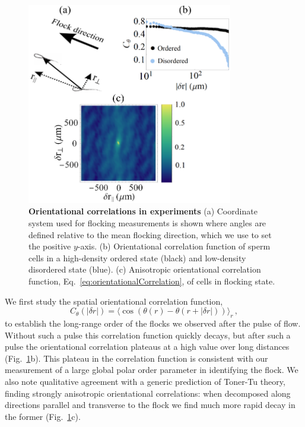 \documentclass[reprint,unsortedaddress,amsmath,amssymb,aps,pre]{revtex4-2}
\begin{document}
\begin{figure}[h]
        \centering
        \includegraphics[width=90mm]{fig_FieldCorrelations_Orientation.PNG}
        \caption{\label{fig::OrientationalSpatialStructure}
        \textbf{Orientational correlations in experiments}
        (a) Coordinate system used for flocking measurements is shown where angles are defined relative to the mean flocking direction, which we use to set the positive $y$-axis. (b) Orientational correlation function of sperm cells in a high-density ordered state (black) and low-density disordered state (blue). (c) Anisotropic orientational correlation function, Eq.~\ref{eq:orientationalCorrelation}, of cells in flocking state.}
\end{figure}

We first study the spatial orientational correlation function,
\begin{equation}\label{eq:orientationalCorrelation}
    C_{\theta}(|\delta{r}|)=\langle{\cos(\theta(r)-\theta(r+|\delta{r}|))}\rangle_{r}\,,
\end{equation}
to establish the long-range order of the flocks we observed after the pulse of flow. Without such a pulse this correlation function quickly decays, but after such a pulse the orientational correlation plateaus at a high value over long distances (Fig.~\ref{fig::OrientationalSpatialStructure}b). This plateau in the correlation function is consistent with our measurement of a large global polar order parameter in identifying the flock. We also note qualitative agreement with a generic prediction of Toner-Tu theory, finding strongly anisotropic orientational correlations: when decomposed along directions parallel and transverse to the flock we find much more rapid decay in the former (Fig.~\ref{fig::OrientationalSpatialStructure}c).
\end{document}
